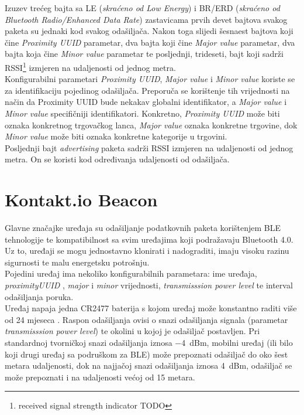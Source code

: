 Izuzev trećeg bajta sa LE (\textit{skraćeno od Low Energy}) i BR/ERD (\textit{skraćeno od Bluetooth Radio/Enhanced Data Rate}) zastavicama prvih devet bajtova svakog paketa su jednaki kod svakog odašiljača. 
Nakon toga slijedi šesnaest bajtova koji čine \textit{Proximity UUID} parametar, dva bajta koji čine \textit{Major value} parametar, dva bajta koja čine \textit{Minor value} parametar te posljednji, trideseti, bajt koji sadrži RSSI\footnote{received signal strength indicator TODO} izmjeren na udaljenosti od jednog metra. %
\\
Konfigurabilni parametari \textit{Proximity UUID}, \textit{Major value} i \textit{Minor value} koriste se za identifikaciju pojedinog odašiljača. 
Preporuča se korištenje tih vrijednosti na način da Proximity UUID bude nekakav globalni identifikator, a \textit{Major value} i \textit{Minor value} specifičniji identifikatori. 
Konkretno, \textit{Proximity UUID} može biti oznaka konkretnog trgovačkog lanca, \textit{Major value} oznaka konkretne trgovine, dok \textit{Minor value} može biti oznaka konkretne kategorije u trgovini.
\\
Posljednji bajt \textit{advertising} paketa sadrži RSSI izmjeren na udaljenosti od jednog metra. On se koristi kod određivanja udaljenosti od odašiljača.

\section*{Kontakt.io Beacon}

Glavne značajke uređaja su odašiljanje podatkovnih paketa korištenjem BLE tehnologije te kompatibilnost sa svim uređajima koji podražavaju Bluetooth 4.0. 
Uz to, uređaji se mogu jednostavno klonirati i nadograditi, imaju visoku razinu sigurnosti te malu energetsku potrošnju.
\\
Pojedini uređaj ima nekoliko konfigurabilnih parametara: ime uređaja, \textit{proximityUUID} , \textit{major} i \textit{minor} vrijednosti, \textit{transmisssion power level} te interval odašiljanja poruka.
\\
Uređaj napaja jedna CR2477 baterija s kojom uređaj može konstantno raditi više od 24 mjeseca \cite{kontaktDatasheet}. 
Raspon odašiljanja ovisi o snazi odašiljanja signala (parametar \textit{transmisssion power level}) te okolini u kojoj je odašiljač postavljen. 
Pri standardnoj tvorničkoj snazi odašiljanja iznosa \SI{-4}{~dBm}, mobilni uređaj (ili bilo koji drugi uređaj sa podruškom za BLE) može prepoznati odašiljač do oko šest metara udaljenosti, dok na najjačoj snazi odašiljanja iznosa \SI{4}{dBm}, odašiljač se može prepoznati i na udaljenosti većoj od 15 metara.

